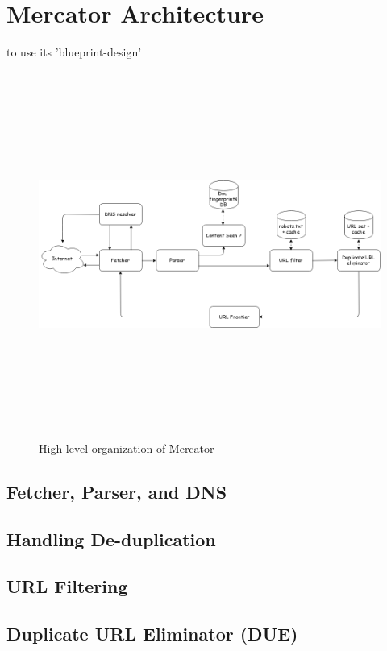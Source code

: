 \section{Mercator Architecture}\label{blueprint}
to use its 'blueprint-design'

\begin{figure}[h!]
  \centering
  \includegraphics[width=15cm,height=12cm,keepaspectratio]{../media/crawler/basic-crawler-architecture-v2.png}
  \caption{High-level organization of Mercator}
  \label{fig:basicarch}
\end{figure}

\subsection{Fetcher, Parser, and DNS}
\subsection{Handling De-duplication}
\subsection{URL Filtering}
\subsection{Duplicate URL Eliminator (DUE)}

